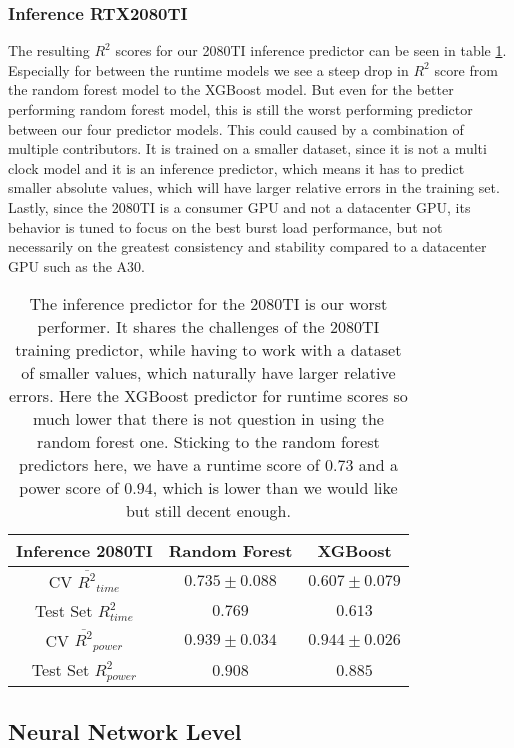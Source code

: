 \subsubsection{Inference RTX2080TI}

The resulting $R^2$ scores for our 2080TI inference predictor can be seen in table \ref{tab:pred_res_2080_inf}. Especially for between the runtime models we see a steep drop in $R^2$ score from the random forest model to the XGBoost model. But even for the better performing random forest model, this is still the worst performing predictor between our four predictor models. This could caused by a combination of multiple contributors. It is trained on a smaller dataset, since it is not a multi clock model and it is an inference predictor, which means it has to predict smaller absolute values, which will have larger relative errors in the training set. Lastly, since the 2080TI is a consumer GPU and not a datacenter GPU, its behavior is tuned to focus on the best burst load performance, but not necessarily on the greatest consistency and stability compared to a datacenter GPU such as the A30.


\begin{table}[h!]
\centering
\begin{tabular}{|c|c|c|}
\hline
 \textbf{Inference 2080TI}& \textbf{Random Forest} & \textbf{XGBoost} \\
\hline
CV $\overline{R^2}_{time}$ & $0.735 \pm 0.088$ &  $0.607 \pm 0.079$ \\
\hline
Test Set $R^2_{time}$ & $0.769$ & $0.613$ \\
\hline
CV $\overline{R^2}_{power}$ & $0.939 \pm 0.034$  &  $0.944 \pm 0.026$\\
\hline
Test Set $R^2_{power}$ & $0.908$ & $0.885$ \\
\hline
\end{tabular}
\caption{The inference predictor for the 2080TI is our worst performer. It shares the challenges of the 2080TI training predictor, while having to work with a dataset of smaller values, which naturally have larger relative errors. Here the XGBoost predictor for runtime scores so much lower that there is not question in using the random forest one. Sticking to the random forest predictors here, we have a runtime score of $0.73$ and a power score of $0.94$, which is lower than we would like but still decent enough.}
\label{tab:pred_res_2080_inf}
\end{table}


\subsection{Neural Network Level}



